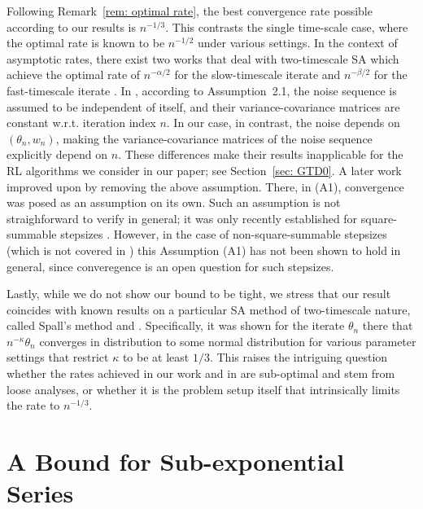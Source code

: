 \documentclass[usenames,dvipsnames,final,12pt]{colt2018} %
\begin{document}
Following Remark~\ref{rem: optimal rate}, the best convergence rate possible according to our results is $n^{-1/3}.$ This contrasts the single time-scale case, where the optimal rate is known to be $n^{-1/2}$ under various settings.
In the context of asymptotic rates, there exist two works that deal with two-timescale SA which achieve the optimal rate of $n^{-\alpha/2}$ for the slow-timescale iterate and $n^{-\beta/2}$ for the fast-timescale iterate \citep{konda2004convergence,mokkadem2006convergence}. In \citep{konda2004convergence}, according to Assumption~2.1, the noise sequence is assumed to be independent of itself, and their variance-covariance matrices are constant w.r.t. iteration index $n$. In our case, in contrast, the noise depends on $(\theta_n,w_n)$, making the variance-covariance matrices of the noise sequence explicitly depend on $n$. These differences make their results inapplicable for the RL algorithms we consider in our paper; see Section~\ref{sec: GTD0}. A later work \citep{mokkadem2006convergence} improved upon \citep{konda2004convergence} by removing the above assumption. There, in (A1), convergence was posed as an assumption on its own. Such an assumption is not straighforward to verify in general; it was only recently established for square-summable stepsizes \citep{lakshminarayanan2017stability}. However, in the case of non-square-summable stepsizes (which is not covered in \citep{mokkadem2006convergence}) this Assumption (A1) has not been shown to hold in general, since converegence is an open question for such stepsizes.

Lastly, while we do not show our bound to be tight, we stress that our result coincides with known results on a particular SA method of two-timescale nature, called Spall's method \citep[Proposition 2]{spall1992multivariate} and \citep[Theorem~5.1]{gerencser1997rate}. Specifically, it was shown for the iterate $\theta_n$ there that $n^{-\kappa}\theta_n$ converges in distribution to some normal distribution for various parameter settings that restrict $\kappa$ to be at least $1/3$.
This raises the intriguing question whether the rates achieved in our work and in \citep{spall1992multivariate,gerencser1997rate} are sub-optimal and stem from loose analyses, or whether it is the problem setup itself that intrinsically limits the rate to $n^{-1/3}$.

\section{A Bound for Sub-exponential Series}
\label{sec: bound for subexponential series}
\end{document}
